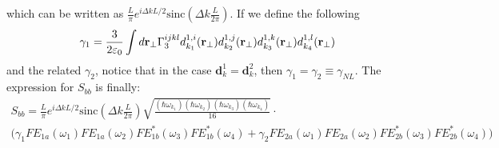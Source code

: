 which can be written as $\frac{L}{\pi}e^{i\Delta k L/2} \text{sinc}\left(\Delta k \frac{L}{2\pi}\right)$. If we define the following
\begin{equation}\gamma_1 = \frac{3}{2\varepsilon_0}\int d\mathbf{r}_\perp \Gamma^{ijkl}_3d^{1,i}_{k_1}(\mathbf{r}_{\perp})d^{1,j}_{k_2}(\mathbf{r}_{\perp})d^{1,k}_{k_3}(\mathbf{r}_{\perp})d^{1,l}_{k_4}(\mathbf{r}_{\perp})\end{equation}
and the related $\gamma_2$, notice that in the case $\mathbf{d}^{1}_{k} = \mathbf{d}^{2}_{k}$, then $\gamma_1 = \gamma_2 \equiv \gamma_{NL}$.  The expression for $S_{bb}$ is finally:
\begin{multline}\label{sbbfinal} S_{bb} = \frac{L}{\pi}e^{i\Delta k L/2} \text{sinc}\left(\Delta k \frac{L}{2\pi}\right) \sqrt{\frac{(\hbar\omega_{k_1})(\hbar\omega_{k_2})(\hbar\omega_{k_3})(\hbar\omega_{k_4})}{16}}\cdot\\ \Bigg( \gamma_1 FE_{1a}(\omega_1)FE_{1a}(\omega_2)FE^*_{1b}(\omega_3)FE^*_{1b}(\omega_4) +\gamma_2 FE_{2a}(\omega_1)FE_{2a}(\omega_2)FE^*_{2b}(\omega_3)FE^*_{2b}(\omega_4)\Bigg)\end{multline}

